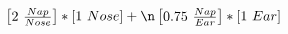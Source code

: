 \documentclass[preview]{standalone}
\begin{document}
\begin{align*}
\begin{bmatrix} 2 \ \frac{Nap}{Nose} \end{bmatrix} *  [1 \ Nose]  + \n \begin{bmatrix} 0.75 \ \frac{Nap}{Ear} \end{bmatrix} *  [1 \ Ear]
\end{align*}
\end{document}

